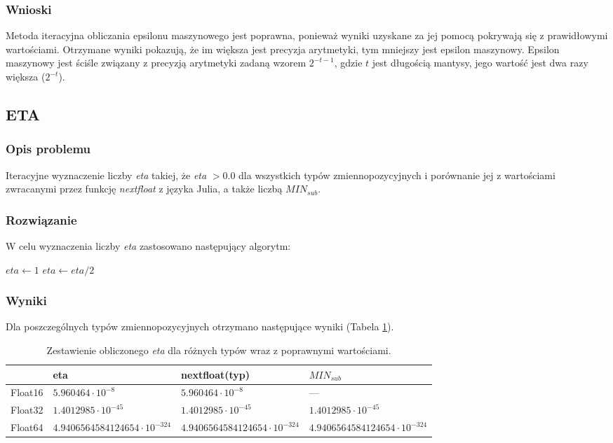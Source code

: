 \documentclass[11pt,a4paper]{article}
\begin{document}
\subsubsection{Wnioski}
Metoda iteracyjna obliczania epsilonu maszynowego jest poprawna, ponieważ wyniki uzyskane za jej pomocą pokrywają się z prawidłowymi wartościami. Otrzymane wyniki pokazują, że im większa jest precyzja arytmetyki, tym mniejszy jest epsilon maszynowy. Epsilon maszynowy jest ściśle związany z precyzją arytmetyki zadaną wzorem $2^{-t-1}$, gdzie $t$ jest długością mantysy, jego wartość jest dwa razy większa ($2^{-t}$).
 
\subsection{ETA}
\subsubsection{Opis problemu}
Iteracyjne wyznaczenie liczby \emph{eta} takiej, że \emph{eta} $> 0.0$ dla wszystkich typów zmiennopozycyjnych i porównanie jej z wartościami zwracanymi przez funkcję \emph{nextfloat} z języka Julia, a także liczbą $MIN_{sub}$.
\subsubsection{Rozwiązanie}
W celu wyznaczenia liczby \emph{eta} zastosowano następujący algorytm:
\begin{algorithmic}
\State $eta\gets 1$
    \State $eta\gets eta/{2}$
\EndWhile
\end{algorithmic}
\subsubsection{Wyniki}
Dla poszczególnych typów zmiennopozycyjnych otrzymano następujące wyniki (Tabela \ref{table:2}).
\begin{table}[!h]
\centering
\begin{tabular}{l | l | l | l}
& eta & nextfloat(typ) & $MIN_{sub}$ \\ \hline
Float16 & $5.960464\cdot 10^{-8}$ & $5.960464\cdot 10^{-8}$ & --- \\
Float32 & $1.4012985\cdot 10^{-45}$ & $1.4012985\cdot 10^{-45}$ & $1.4012985\cdot 10^{-45}$ \\
Float64 & $4.9406564584124654\cdot 10^{-324}$ & $4.9406564584124654\cdot 10^{-324}$ & $4.9406564584124654\cdot 10^{-324}$ \\
\end{tabular}
\caption{\label{table:2}Zestawienie obliczonego \emph{eta} dla różnych typów wraz z poprawnymi wartościami.}
\end{table}
\end{document}
